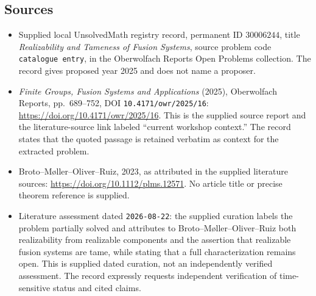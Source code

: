 \documentclass[11pt]{article}
\begin{document}
\subsection{Sources}
\begin{itemize}
\item Supplied local UnsolvedMath registry record, permanent ID \(30006244\), title \emph{Realizability and Tameness of Fusion Systems}, source problem code \texttt{catalogue entry}, in the Oberwolfach Reports Open Problems collection. The record gives proposed year 2025 and does not name a proposer.
\item \emph{Finite Groups, Fusion Systems and Applications} (2025), Oberwolfach Reports, pp.\ 689--752, DOI \texttt{10.4171/owr/2025/16}: \url{https://doi.org/10.4171/owr/2025/16}. This is the supplied source report and the literature-source link labeled ``current workshop context.'' The record states that the quoted passage is retained verbatim as context for the extracted problem.
\item Broto--M{\o}ller--Oliver--Ruiz, 2023, as attributed in the supplied literature sources: \url{https://doi.org/10.1112/plms.12571}. No article title or precise theorem reference is supplied.
\item Literature assessment dated \texttt{2026-08-22}: the supplied curation labels the problem partially solved and attributes to Broto--M{\o}ller--Oliver--Ruiz both realizability from realizable components and the assertion that realizable fusion systems are tame, while stating that a full characterization remains open. This is supplied dated curation, not an independently verified assessment. The record expressly requests independent verification of time-sensitive status and cited claims.
\end{itemize}
\end{document}
